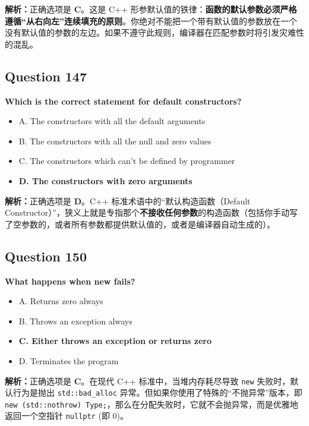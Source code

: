 \documentclass[11pt, a4paper]{article}
\begin{document}
\textbf{解析：}正确选项是 \textbf{C}。这是 C++ 形参默认值的铁律：\textbf{函数的默认参数必须严格遵循“从右向左”连续填充的原则}。你绝对不能把一个带有默认值的参数放在一个没有默认值的参数的左边。如果不遵守此规则，编译器在匹配参数时将引发灾难性的混乱。


\subsection*{Question 147}
\textbf{Which is the correct statement for default constructors?}
\begin{itemize}
    \item A. The constructors with all the default arguments
    \item B. The constructors with all the null and zero values
    \item C. The constructors which can’t be defined by programmer
    \item \textbf{D. The constructors with zero arguments}
\end{itemize}

\textbf{解析：}正确选项是 \textbf{D}。C++ 标准术语中的“默认构造函数（Default Constructor）”，狭义上就是专指那个\textbf{不接收任何参数}的构造函数（包括你手动写了空参数的，或者所有参数都提供默认值的，或者是编译器自动生成的）。


\subsection*{Question 150}
\textbf{What happens when new fails?}
\begin{itemize}
    \item A. Returns zero always
    \item B. Throws an exception always
    \item \textbf{C. Either throws an exception or returns zero}
    \item D. Terminates the program
\end{itemize}

\textbf{解析：}正确选项是 \textbf{C}。在现代 C++ 标准中，当堆内存耗尽导致 \texttt{new} 失败时，默认行为是抛出 \texttt{std::bad\_alloc} 异常。但如果你使用了特殊的“不抛异常”版本，即 \texttt{new (std::nothrow) Type;}，那么在分配失败时，它就不会抛异常，而是优雅地返回一个空指针 \texttt{nullptr} (即 0)。
\end{document}
